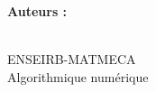\documentclass[a4paper,12pt]{article}
\title{\texteTitre}
\author{\texteAuteurs}
\date{\texteDate}
\begin{document}


\hypersetup{pageanchor=false}
\begin{titlepage}
    \centering

    \vspace*{1.5cm}

    {\Huge\bfseries \texteNumero\par}

    \vspace{0.8cm}

    {\LARGE \texteTitre \par}

    \vspace{7cm}

    {\Large
    \textbf{Auteurs :}\\
    \texteAuteurs\par}

    \vfill

    {\large
    \texteDate\\
    ENSEIRB-MATMECA\\
    Algorithmique numérique
    \par}

    \vspace{1cm}

\end{titlepage}
\hypersetup{pageanchor=true} %


\tableofcontents
\newpage


\section{}

\section{}

\section{}


\section*{}


\newpage
\printbibliography[title=Références]
\end{document}
